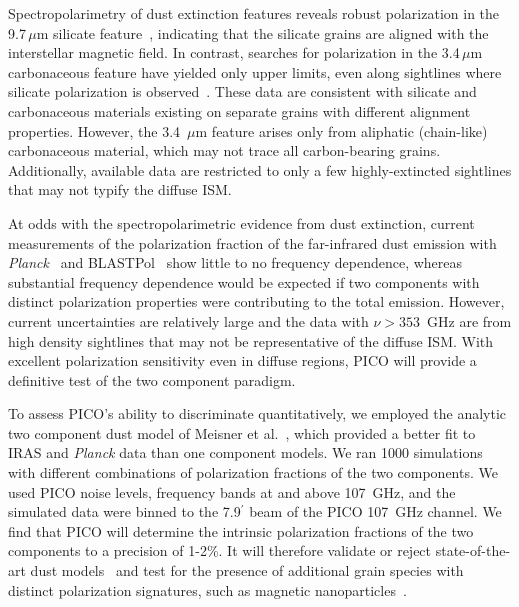 \documentclass[PICOReport.tex]{subfiles}
\begin{document}
Spectropolarimetry of dust extinction features reveals robust polarization in the 9.7\,$\mu$m silicate feature~\citep[e.g.,][]{Smith2000}, indicating that the silicate grains are aligned with the interstellar magnetic field. In contrast, searches for polarization in the 3.4\,$\mu$m carbonaceous feature have yielded only upper limits, even along sightlines where silicate polarization is observed~\citep{Chiar2006,Mason2007}. These data are consistent with silicate and carbonaceous materials existing on separate grains with different alignment properties. However, the 3.4~$\mu$m feature arises only from aliphatic (chain-like) carbonaceous material, which may not trace all carbon-bearing grains. Additionally, available data are restricted to only a few highly-extincted sightlines that may not typify the diffuse \ac{ISM}.

At odds with the spectropolarimetric evidence from dust extinction, current measurements of the polarization fraction of the far-infrared dust emission with {\it Planck}~\citep{Planck_Int_XXII} and BLASTPol~\citep{Ashton2018} show little to no frequency dependence, whereas substantial frequency dependence would be expected if two components with distinct polarization properties were contributing to the total emission. However, current uncertainties are relatively large and the data with $\nu > 353$~GHz are from high density sightlines that may not be representative of the diffuse \ac{ISM}. With excellent polarization sensitivity even in diffuse regions, PICO will provide a definitive test of the two component paradigm.

To assess PICO's ability to discriminate  quantitatively, we employed the analytic two component dust model of Meisner et al.~\cite{Meisner2015}, which provided a better fit to IRAS and {\it Planck} data than one component models. We ran 1000 simulations with different combinations of polarization fractions of the two components. We used PICO  noise levels, frequency bands at and above 107~GHz, and the simulated data were binned to the 7.9$^\prime$ beam of the PICO 107~GHz channel. We find that PICO will determine the intrinsic polarization fractions of the two components to a precision of 1-2\%. It will therefore validate or reject state-of-the-art dust models~\citep[e.g.][Hensley \& Draine, in prep]{Guillet2018} and test for the presence of additional grain species with distinct polarization signatures, such as magnetic nanoparticles~\citep{Draine2013}. %
%
\end{document}
